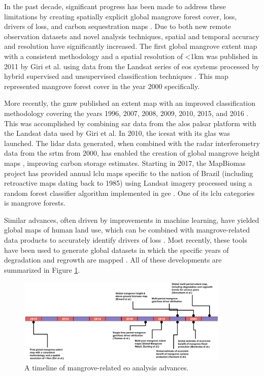 In the past decade, significant progress has been made to address these limitations by creating spatially explicit global mangrove forest cover, loss, drivers of loss, and carbon sequestration maps \cite{spaldingWorldAtlasMangroves2010, donatoMangrovesMostCarbonrich2011, sandermanGlobalMapMangrove2018, simardMangroveCanopyHeight2019, goldbergGlobalDeclinesHuman2020}. Due to both new remote observation datasets and novel analysis techniques, spatial and temporal accuracy and resolution have significantly increased. The first global mangrove extent map with a consistent methodology and a spatial resolution of <1km was published in 2011 by Giri et al. using data from the Landsat series of \acp{eo} systems processed by hybrid supervised and unsupervised classification techniques \cite{giriStatusDistributionMangrove2011}. This map represented mangrove forest cover in the year 2000 specifically. 

More recently, the \ac{gmw} published an extent map with an improved classification methodology covering the years 1996, 2007, 2008, 2009, 2010, 2015, and 2016 \cite{buntingGlobalMangroveWatch2018}. This was accomplished by combining \ac{sar} data from the \ac{alos} \ac{palsar} platform with the Landsat data used by Giri et al. In 2010, the \ac{icesat} with its \ac{glas} was launched. The lidar data generated, when combined with the radar interferometry data from the \ac{srtm} from 2000, has enabled the creation of global mangrove height maps \cite{simardMangroveCanopyHeight2019}, improving carbon storage estimates. Starting in 2017, the MapBiomas project has provided annual \ac{lclu} maps specific to the nation of Brazil (including retroactive maps dating back to 1985) using Landsat imagery processed using a random forest classifier algorithm implemented in \ac{gee} \cite{raisg-mapbiomasconsortiumMapBiomasAmazoniaProject2021}. One of its \ac{lclu} categories is mangrove forests. 

Similar advances, often driven by improvements in machine learning, have yielded global maps of human land use, which can be combined with mangrove-related data products to accurately identify drivers of loss \cite{goldbergGlobalDeclinesHuman2020}. Most recently, these tools have been used to generate global datasets in which the specific years of degradation and regrowth are mapped \cite{vancutsemLongterm199020192021}. All of these developments are summarized in Figure \ref{fig:mangrove_timeline}.

\begin{figure}[!htb]
\centering
\includegraphics[width=0.9\textwidth]{Figures/chap4/mangrove_timeline.png}
\caption[Timeline of Mangrove-Related EO Advances]{A timeline of mangrove-related \ac{eo} analysis advances.}
\label{fig:mangrove_timeline}
\end{figure}

